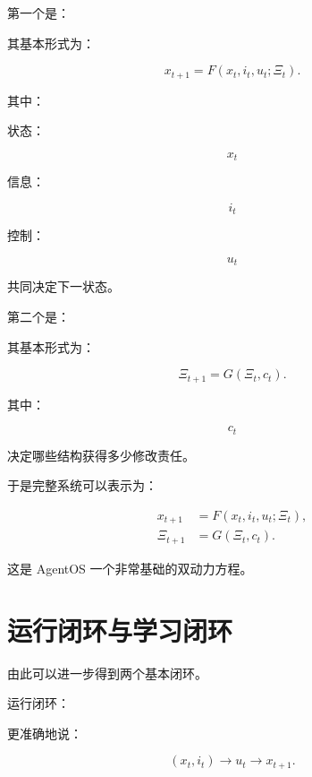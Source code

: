 第一个是：

\begin{statementbox}
\centering
{}
\end{statementbox}

其基本形式为：

\[
\boxed{
x_{t+1}
=
F(
x_t,
i_t,
u_t;
\Xi_t
).
}
\]

其中：

状态：

\[
x_t
\]

信息：

\[
i_t
\]

控制：

\[
u_t
\]

共同决定下一状态。

第二个是：

\begin{statementbox}
\centering
{}
\end{statementbox}

其基本形式为：

\[
\boxed{
\Xi_{t+1}
=
G(
\Xi_t,
c_t
).
}
\]

其中：

\[
c_t
\]

决定哪些结构获得多少修改责任。

于是完整系统可以表示为：

\[
\boxed{
\begin{aligned}
x_{t+1}
&=
F(x_t,i_t,u_t;\Xi_t),
\\
\Xi_{t+1}
&=
G(\Xi_t,c_t).
\end{aligned}
}
\]

这是 AgentOS 一个非常基础的双动力方程。

\section{运行闭环与学习闭环}

由此可以进一步得到两个基本闭环。

运行闭环：

\begin{statementbox}
\centering
{}
\end{statementbox}

更准确地说：

\[
(x_t,i_t)
\rightarrow
u_t
\rightarrow
x_{t+1}.
\]

